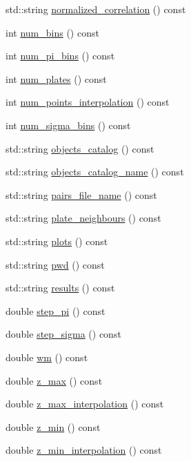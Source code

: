 \begin{DoxyCompactItemize}
std\-::string \hyperlink{class_global_variables_a7481f788f94ed1bdb590057d7a0f48ca}{normalized\-\_\-correlation} () const 
\item 
int \hyperlink{class_global_variables_a8df4bf4e1962af98f59cd43947188509}{num\-\_\-bins} () const 
\item 
int \hyperlink{class_global_variables_a08ee1fac0ba1c1eccb8fd405c1f9cb1c}{num\-\_\-pi\-\_\-bins} () const 
\item 
int \hyperlink{class_global_variables_a09a6fd5da6b9c5a3a9aa63bee7e4466f}{num\-\_\-plates} () const 
\item 
int \hyperlink{class_global_variables_a054d4cf825a69d3461475a3590799774}{num\-\_\-points\-\_\-interpolation} () const 
\item 
int \hyperlink{class_global_variables_a5ccd02c696d64e9c33fc6a7e1ba8b9ef}{num\-\_\-sigma\-\_\-bins} () const 
\item 
std\-::string \hyperlink{class_global_variables_ab3641ef310a60651c562a7dc8864d0e9}{objects\-\_\-catalog} () const 
\item 
std\-::string \hyperlink{class_global_variables_a8412ac07504633c4abd23702b4d4d823}{objects\-\_\-catalog\-\_\-name} () const 
\item 
std\-::string \hyperlink{class_global_variables_ac10711bcd7293ce5da996b4f5b79de2b}{pairs\-\_\-file\-\_\-name} () const 
\item 
std\-::string \hyperlink{class_global_variables_abf1a6505c3dab27b4dc58fc1634e70e7}{plate\-\_\-neighbours} () const 
\item 
std\-::string \hyperlink{class_global_variables_a825d2ce1a68bbdca6395aa10690e3407}{plots} () const 
\item 
std\-::string \hyperlink{class_global_variables_a03e3e8cbe112ab714544e57f541a693f}{pwd} () const 
\item 
std\-::string \hyperlink{class_global_variables_a53b4346935148918029cc1a2daaad80c}{results} () const 
\item 
double \hyperlink{class_global_variables_aba979c1ae01246184e65e4034007f0ca}{step\-\_\-pi} () const 
\item 
double \hyperlink{class_global_variables_a0a1e6c768c7323c1da081db7c375060e}{step\-\_\-sigma} () const 
\item 
double \hyperlink{class_global_variables_ae01eadf8a6614c2b8f5e5a5da5b0a7c3}{wm} () const 
\item 
double \hyperlink{class_global_variables_a09e2005546be6c1147d898fbd9f040e0}{z\-\_\-max} () const 
\item 
double \hyperlink{class_global_variables_ad2dee77ee4d577e3a9575184089735ac}{z\-\_\-max\-\_\-interpolation} () const 
\item 
double \hyperlink{class_global_variables_ac6ed0b46b3ab483ba201b193b0953905}{z\-\_\-min} () const 
\item 
double \hyperlink{class_global_variables_a3f167911da6733d4f4ebf58949d24c02}{z\-\_\-min\-\_\-interpolation} () const 
\end{DoxyCompactItemize}


